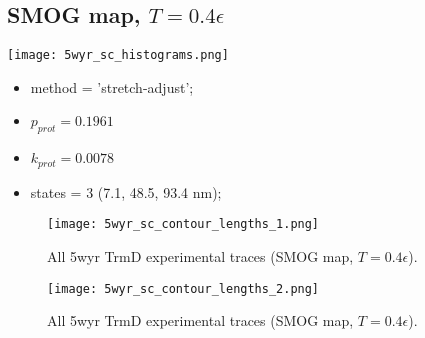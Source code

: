 \subsection{SMOG map, $T=0.4\epsilon$}
\label{subsec:5wyr-sc}
\begin{minipage}[c]{0.7\textwidth}
    \texttt{[image: 5wyr\_sc\_histograms.png]}
\end{minipage}
\hfill
\begin{minipage}[c]{0.45\textwidth}
    \begin{itemize}
        \item method = 'stretch-adjust';
        \item $p_{prot}=0.1961$
        \item $k_{prot}=0.0078$
        \item states = 3 (7.1, 48.5, 93.4 nm);
    \end{itemize}
\end{minipage}

\begin{figure}
    \centering
    \texttt{[image: 5wyr\_sc\_contour\_lengths\_1.png]}
    \caption{All 5wyr TrmD experimental traces (SMOG map, $T=0.4\epsilon$).}
    \label{fig:5wyr-sc-cl1}
\end{figure}

\begin{figure}
    \centering
    \texttt{[image: 5wyr\_sc\_contour\_lengths\_2.png]}
    \caption{All 5wyr TrmD experimental traces (SMOG map, $T=0.4\epsilon$).}
    \label{fig:5wyr-sc-cl2}
\end{figure}

